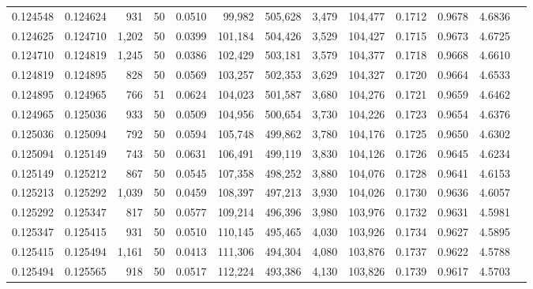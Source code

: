 \begin{tabular}{rrrrrrrrrrrrr}
0.124548 & 0.124624 &   931 &  50 &                                     0.0510 &  99,982 & 505,628 &   3,479 & 104,477 & 0.1712 & 0.9678 & 4.6836 \\
0.124625 & 0.124710 & 1,202 &  50 &                                     0.0399 & 101,184 & 504,426 &   3,529 & 104,427 & 0.1715 & 0.9673 & 4.6725 \\
0.124710 & 0.124819 & 1,245 &  50 &                                     0.0386 & 102,429 & 503,181 &   3,579 & 104,377 & 0.1718 & 0.9668 & 4.6610 \\
0.124819 & 0.124895 &   828 &  50 &                                     0.0569 & 103,257 & 502,353 &   3,629 & 104,327 & 0.1720 & 0.9664 & 4.6533 \\
0.124895 & 0.124965 &   766 &  51 &                                     0.0624 & 104,023 & 501,587 &   3,680 & 104,276 & 0.1721 & 0.9659 & 4.6462 \\
0.124965 & 0.125036 &   933 &  50 &                                     0.0509 & 104,956 & 500,654 &   3,730 & 104,226 & 0.1723 & 0.9654 & 4.6376 \\
0.125036 & 0.125094 &   792 &  50 &                                     0.0594 & 105,748 & 499,862 &   3,780 & 104,176 & 0.1725 & 0.9650 & 4.6302 \\
0.125094 & 0.125149 &   743 &  50 &                                     0.0631 & 106,491 & 499,119 &   3,830 & 104,126 & 0.1726 & 0.9645 & 4.6234 \\
0.125149 & 0.125212 &   867 &  50 &                                     0.0545 & 107,358 & 498,252 &   3,880 & 104,076 & 0.1728 & 0.9641 & 4.6153 \\
0.125213 & 0.125292 & 1,039 &  50 &                                     0.0459 & 108,397 & 497,213 &   3,930 & 104,026 & 0.1730 & 0.9636 & 4.6057 \\
0.125292 & 0.125347 &   817 &  50 &                                     0.0577 & 109,214 & 496,396 &   3,980 & 103,976 & 0.1732 & 0.9631 & 4.5981 \\
0.125347 & 0.125415 &   931 &  50 &                                     0.0510 & 110,145 & 495,465 &   4,030 & 103,926 & 0.1734 & 0.9627 & 4.5895 \\
0.125415 & 0.125494 & 1,161 &  50 &                                     0.0413 & 111,306 & 494,304 &   4,080 & 103,876 & 0.1737 & 0.9622 & 4.5788 \\
0.125494 & 0.125565 &   918 &  50 &                                     0.0517 & 112,224 & 493,386 &   4,130 & 103,826 & 0.1739 & 0.9617 & 4.5703 \\

\end{tabular}
